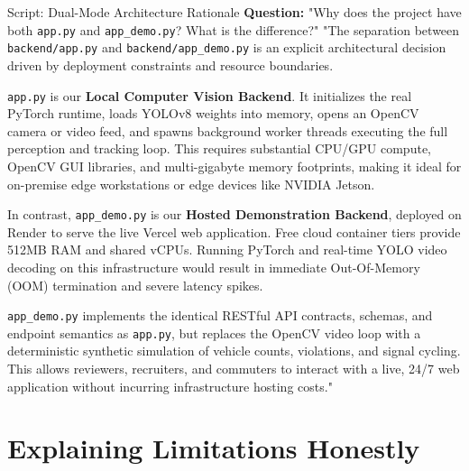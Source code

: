 \begin{interviewq}{Script: Dual-Mode Architecture Rationale}
\textbf{Question:} "Why does the project have both \texttt{app.py} and \texttt{app\_demo.py}? What is the difference?"
\tcblower
"The separation between \texttt{backend/app.py} and \texttt{backend/app\_demo.py} is an explicit architectural decision driven by deployment constraints and resource boundaries.

\texttt{app.py} is our \textbf{Local Computer Vision Backend}. It initializes the real PyTorch runtime, loads YOLOv8 weights into memory, opens an OpenCV camera or video feed, and spawns background worker threads executing the full perception and tracking loop. This requires substantial CPU/GPU compute, OpenCV GUI libraries, and multi-gigabyte memory footprints, making it ideal for on-premise edge workstations or edge devices like NVIDIA Jetson.

In contrast, \texttt{app\_demo.py} is our \textbf{Hosted Demonstration Backend}, deployed on Render to serve the live Vercel web application. Free cloud container tiers provide 512MB RAM and shared vCPUs. Running PyTorch and real-time YOLO video decoding on this infrastructure would result in immediate Out-Of-Memory (OOM) termination and severe latency spikes.

\texttt{app\_demo.py} implements the identical RESTful API contracts, schemas, and endpoint semantics as \texttt{app.py}, but replaces the OpenCV video loop with a deterministic synthetic simulation of vehicle counts, violations, and signal cycling. This allows reviewers, recruiters, and commuters to interact with a live, 24/7 web application without incurring infrastructure hosting costs."
\end{interviewq}

\section{Explaining Limitations Honestly}
\label{sec:script_limitations_honesty}

